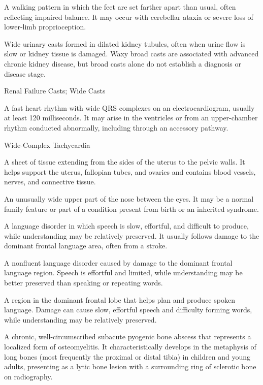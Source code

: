 A walking pattern in which the feet are set farther apart than usual, often reflecting impaired balance. It may occur with cerebellar ataxia or severe loss of lower-limb proprioception.

 Wide urinary casts formed in dilated kidney tubules, often when urine flow is slow or kidney tissue is damaged. Waxy broad casts are associated with advanced chronic kidney disease, but broad casts alone do not establish a diagnosis or disease stage.

\synonyms
Renal Failure Casts; Wide Casts

 A fast heart rhythm with wide QRS complexes
on an electrocardiogram, usually at least 120 milliseconds. It may arise in the
ventricles or from an upper-chamber rhythm conducted abnormally, including
through an accessory pathway.

\synonyms
Wide-Complex Tachycardia

 A sheet of tissue extending from the sides of the uterus to the pelvic walls. It helps support the uterus, fallopian tubes, and ovaries and contains blood vessels, nerves, and connective tissue.

 An unusually wide upper part of the nose between the eyes. It may be a normal family feature or part of a condition present from birth or an inherited syndrome.

 A language disorder in which speech is slow, effortful, and difficult to produce, while understanding may be relatively preserved. It usually follows damage to the dominant frontal language area, often from a stroke.

 A nonfluent language disorder caused by damage to the dominant frontal language region. Speech is effortful and limited, while understanding may be better preserved than speaking or repeating words.

 A region in the dominant frontal lobe that helps plan and produce spoken language. Damage can cause slow, effortful speech and difficulty forming words, while understanding may be relatively preserved.

 A chronic, well-circumscribed subacute pyogenic bone abscess that represents a localized form of osteomyelitis. It characteristically develops in the metaphysis of long bones (most frequently the proximal or distal tibia) in children and young adults, presenting as a lytic bone lesion with a surrounding ring of sclerotic bone on radiography.

